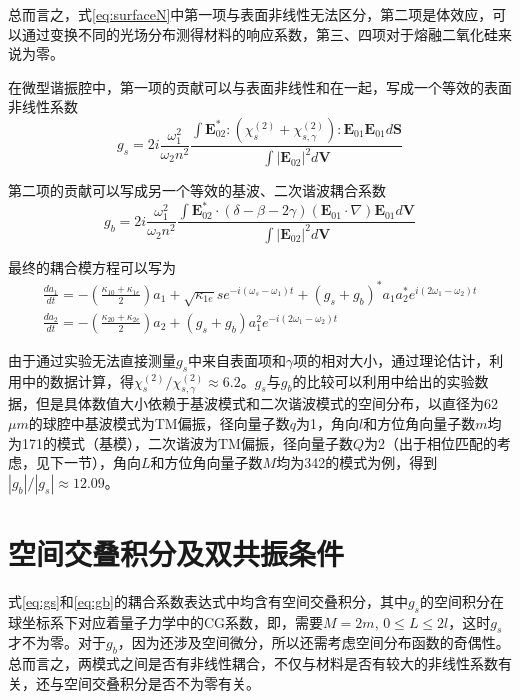 总而言之，式\ref{eq:surfaceN}中第一项与表面非线性无法区分，第二项是体效应，可以通过变换不同的光场分布测得材料的响应系数，第三、四项对于熔融二氧化硅来说为零。

在微型谐振腔中，第一项的贡献可以与表面非线性和在一起，写成一个等效的表面非线性系数
\begin{equation}
g_s = 2i\frac{\omega_1^2}{\omega_2n^2}\frac{\int \mathbf{E}_{02}^*:(\chi^{(2)}_s+\chi^{(2)}_{s,\gamma}):\mathbf{E}_{01}\mathbf{E}_{01} d\mathbf{S}}{\int |\mathbf{E}_{02}|^2 d\mathbf{V}}
\label{eq:gs}
\end{equation}


第二项的贡献可以写成另一个等效的基波、二次谐波耦合系数
\begin{equation}
g_b =  2i\frac{\omega_1^2}{\omega_2n^2}\frac{\int \mathbf{E}_{02}^* \cdot (\delta-\beta-2\gamma)(\mathbf{E}_{01}\cdot\nabla)\mathbf{E}_{01} d\mathbf{V}}{\int |\mathbf{E}_{02}|^2 d\mathbf{V}}
\label{eq:gb}
\end{equation}

最终的耦合模方程可以写为
\begin{gather}
\label{eq:cpmode}
\frac{da_1}{dt} = -(\frac{\kappa_{10}+\kappa_{1e}}{2})a_1+\sqrt{\kappa_{1e}}se^{-i(\omega_s-\omega_1)t}+(g_s+g_b)^*a_1a_2^*e^{i(2\omega_1-\omega_2)t} \\
\frac{da_2}{dt} = -(\frac{\kappa_{20}+\kappa_{2e}}{2})a_2+(g_s+g_b)a_1^2e^{-i(2\omega_1-\omega_2)t}
\label{eq:cpmode2}
\end{gather}

由于通过实验无法直接测量$g_s$中来自表面项和$\gamma$项的相对大小，通过理论估计，利用\cite{terhune1987second}中的数据计算，得$\chi^{(2)}_s/\chi^{(2)}_{s,\gamma}\approx 6.2$。$g_s$与$g_b$的比较可以利用\cite{rodriguez2008calibration}中给出的实验数据，但是具体数值大小依赖于基波模式和二次谐波模式的空间分布，以直径为62$\mu m$的球腔中基波模式为TM偏振，径向量子数$q$为1，角向$l$和方位角向量子数$m$均为171的模式（基模），二次谐波为TM偏振，径向量子数$Q$为2（出于相位匹配的考虑，见下一节），角向$L$和方位角向量子数$M$均为342的模式为例，得到$|g_b|/|g_s|\approx12.09$。


\section{空间交叠积分及双共振条件}
\label{sec:2Resonance}
式\ref{eq:gs}和\ref{eq:gb}的耦合系数表达式中均含有空间交叠积分，其中$g_s$的空间积分在球坐标系下对应着量子力学中的CG系数，即，需要$M=2m$, $0\le L \le 2l$，这时$g_s$才不为零。对于$g_b$，因为还涉及空间微分，所以还需考虑空间分布函数的奇偶性。总而言之，两模式之间是否有非线性耦合，不仅与材料是否有较大的非线性系数有关，还与空间交叠积分是否不为零有关。


